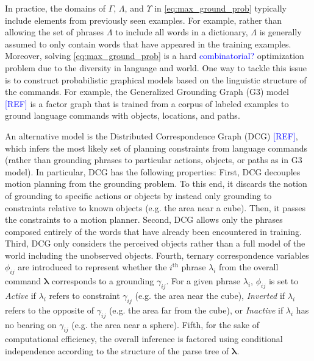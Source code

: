 In practice, the domains of $\Gamma$, $\Lambda$, and $\Upsilon$ in \eqref{eq:max_ground_prob} typically include elements from previously seen examples. %
For example, rather than allowing the set of phrases $\Lambda$ to include all words in a dictionary, $\Lambda$ is generally assumed to only contain words that have appeared in the training examples. Moreover, solving \eqref{eq:max_ground_prob} is a hard \textcolor{blue}{combinatorial?} optimization problem due to the diversity in language and world.
One way to tackle this issue is to construct probabilistic graphical models based on the linguistic structure of the commands. For example, the Generalized Grounding Graph (G3) model \textcolor{blue}{[REF]} is a factor graph that is trained from a corpus of labeled examples to ground language commands with objects, locations, and paths.  

An alternative model is the Distributed Correspondence Graph (DCG) \textcolor{blue}{[REF]}, which infers the most likely set of planning constraints from language commands (rather than grounding phrases to particular actions, objects, or paths as in G3 model). In particular, DCG has the following properties:  
First, DCG decouples motion planning from the grounding problem. To this end, it discards the notion of grounding to specific actions or objects by instead only grounding to constraints relative to known objects (e.g. the area near a cube). Then, it passes the constraints to a motion planner.
Second, DCG allows only the phrases composed entirely of the words that have already been encountered in training.
Third, DCG only considers the perceived objects rather than a full model of the world including the unobserved objects.
Fourth, ternary correspondence variables $\phi_{ij}$ are introduced to represent whether the $i^\text{th}$ phrase $\lambda_i$ from the overall command $\boldsymbol{\lambda}$ corresponds to a grounding $\gamma_{ij}$.
For a given phrase $\lambda_i$, $\phi_{ij}$ is set to \emph{Active} if $\lambda_i$ refers to constraint $\gamma_{ij}$ (e.g. the area near the cube), \emph{Inverted} if $\lambda_i$ refers to the opposite of $\gamma_{ij}$ (e.g. the area far from the cube), or \emph{Inactive} if $\lambda_i$ has no bearing on $\gamma_{ij}$ (e.g. the area near a sphere).
Fifth, for the sake of computational efficiency, the overall inference is factored using conditional independence according to the structure of the parse tree of $\boldsymbol{\lambda}$.

